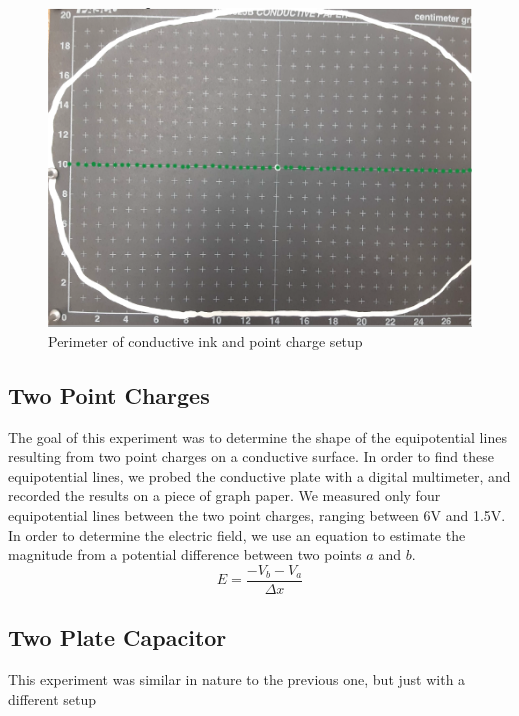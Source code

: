 \documentclass[titlepage]{article}
\begin{document}
    \FloatBarrier
    \begin{figure}[hbt!]
        \centering
        \caption{Perimeter of conductive ink and point charge setup}
        \includegraphics[scale=0.8]{procedure/part1}
    \end{figure} 
    \FloatBarrier



    

    \subsection{Two Point Charges}
    The goal of this experiment was to determine the shape of the equipotential lines resulting from two point charges on a conductive surface. In order to find these equipotential lines, we probed the conductive plate with a digital multimeter, and recorded the results on a piece of graph paper. We measured only four equipotential lines between the two point charges, ranging between 6V and 1.5V. In order to determine the electric field, we use an equation to estimate the magnitude from a potential difference between two points $a$ and $b$.
    $$E=\frac{-V_b-V_a}{\Delta x}$$



    \subsection{Two Plate Capacitor}
    This experiment was similar in nature to the previous one, but just with a different setup
\end{document}
